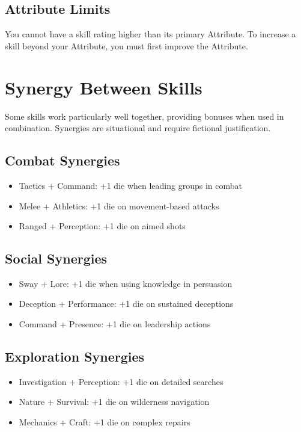 \documentclass[11pt,twoside,openany]{book}
\begin{document}
\subsection*{Attribute Limits}

You cannot have a skill rating higher than its primary Attribute. To increase a skill beyond your Attribute, you must first improve the Attribute.

\section*{Synergy Between Skills} 

Some skills work particularly well together, providing bonuses when used in combination. Synergies are situational and require fictional justification.

\subsection*{Combat Synergies}

\begin{itemize}
\item Tactics + Command: +1 die when leading groups in combat
\item Melee + Athletics: +1 die on movement-based attacks
\item Ranged + Perception: +1 die on aimed shots
\end{itemize}

\subsection*{Social Synergies}

\begin{itemize}
\item Sway + Lore: +1 die when using knowledge in persuasion
\item Deception + Performance: +1 die on sustained deceptions
\item Command + Presence: +1 die on leadership actions
\end{itemize}

\subsection*{Exploration Synergies}

\begin{itemize}
\item Investigation + Perception: +1 die on detailed searches
\item Nature + Survival: +1 die on wilderness navigation
\item Mechanics + Craft: +1 die on complex repairs
\end{itemize}
\end{document}
